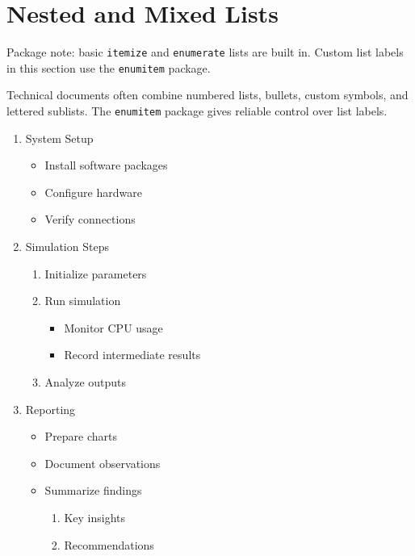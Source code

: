 \documentclass[11pt,a4paper]{article}
\begin{document}
\section{Nested and Mixed Lists}

Package note: basic \texttt{itemize} and \texttt{enumerate} lists are built in.
Custom list labels in this section use the \texttt{enumitem} package.

Technical documents often combine numbered lists, bullets, custom symbols, and
lettered sublists. The \texttt{enumitem} package gives reliable control over
list labels.

\begin{enumerate}[label=\arabic*.]
    \item System Setup
    \begin{itemize}
        \item Install software packages
        \item Configure hardware
        \item[!] Verify connections
    \end{itemize}

    \item Simulation Steps
    \begin{enumerate}[label=(\alph*)]
        \item Initialize parameters
        \item Run simulation
        \begin{itemize}[label=-]
            \item Monitor CPU usage
            \item[$\rightarrow$] Record intermediate results
        \end{itemize}
        \item Analyze outputs
    \end{enumerate}

    \item Reporting
    \begin{itemize}
        \item Prepare charts
        \item[\#] Document observations
        \item Summarize findings
        \begin{enumerate}[label=(\alph*)]
            \item Key insights
            \item Recommendations
        \end{enumerate}
    \end{itemize}
\end{enumerate}
\end{document}
